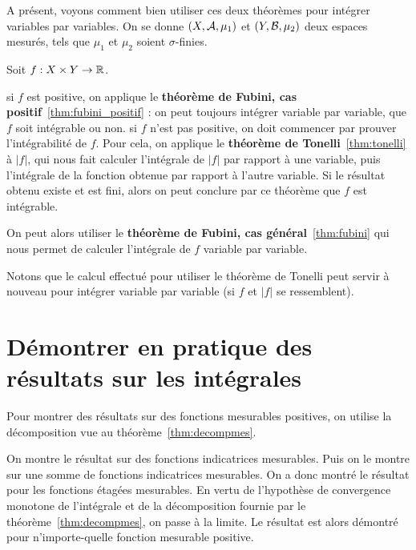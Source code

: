 \documentclass[../integ-proba.tex]{subfiles}
\begin{document}
  \begin{rem}
    A présent, voyons comment bien utiliser ces deux théorèmes pour intégrer variables par variables.
    On se donne $\left(X, \mathcal{A}, \mu_1\right)$ et $\left(Y, \mathcal{B}, \mu_2\right)$ deux espaces mesurés, tels que $\mu_1$ et $\mu_2$ soient $\sigma$-finies.

    Soit $f:X \times Y \rightarrow \mathbb{R}$.
    \begin{itemize}
      \itemb si $f$ est positive, on applique le \textbf{théorème de Fubini, cas positif}~\ref{thm:fubini_positif} : on peut toujours intégrer variable par variable, que $f$ soit intégrable ou non.
      \itemb si $f$ n'est pas positive, on doit commencer par prouver l'intégrabilité de $f$.
      Pour cela, on applique le \textbf{théorème de Tonelli}~\ref{thm:tonelli} à $\left|f\right|$, qui nous fait calculer l'intégrale de $\left|f\right|$ par rapport à une variable, puis l'intégrale de la fonction obtenue par rapport à l'autre variable.
      Si le résultat obtenu existe et est fini, alors on peut conclure par ce théorème que $f$ est intégrable.

      On peut alors utiliser le \textbf{théorème de Fubini, cas général}~\ref{thm:fubini} qui nous permet de calculer l'intégrale de $f$ variable par variable.

      Notons que le calcul effectué pour utiliser le théorème de Tonelli peut servir à nouveau pour intégrer variable par variable (si $f$ et $\left|f\right|$ se ressemblent).
    \end{itemize}
  \end{rem}

  \section{Démontrer en pratique des résultats sur les intégrales}

  Pour montrer des résultats sur des fonctions mesurables positives, on utilise la décomposition vue au théorème~\ref{thm:decompmes}.
  \begin{itemize}
    \itemb On montre le résultat sur des fonctions indicatrices mesurables.
    \itemb Puis on le montre sur une somme de fonctions indicatrices mesurables.
    On a donc montré le résultat pour les fonctions étagées mesurables.
    \itemb En vertu de l'hypothèse de convergence monotone de l'intégrale et de la décomposition fournie par le théorème~\ref{thm:decompmes}, on passe à la limite.
    Le résultat est alors démontré pour n'importe-quelle fonction mesurable positive.
  \end{itemize}
\end{document}
